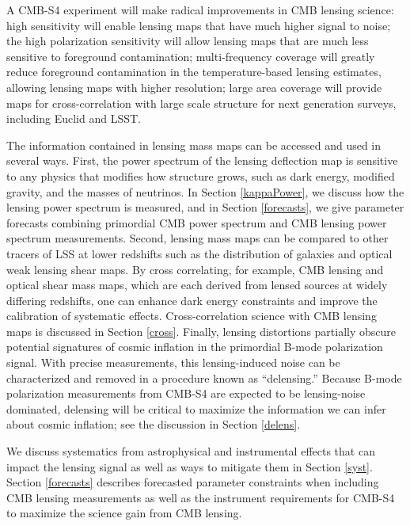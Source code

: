 A CMB-S4 experiment will make radical improvements in CMB lensing science:
high sensitivity will enable lensing maps that have much higher signal to
noise; the high polarization sensitivity will allow
lensing maps that are much less sensitive to foreground contamination;
multi-frequency coverage will greatly reduce foreground 
contamination in the temperature-based lensing estimates, 
allowing lensing maps with higher resolution;
large area coverage will provide maps for cross-correlation with large
scale structure for next generation surveys, including Euclid and LSST.


The information contained in lensing mass maps can be accessed and used in several ways.
First, the power spectrum of the lensing deflection map is sensitive to any physics that modifies how structure grows, such as dark energy, modified gravity, and the masses of neutrinos.
In Section \ref{kappaPower}, we discuss how the lensing power spectrum is measured, and in Section \ref{forecasts}, we give parameter forecasts combining primordial CMB power spectrum and CMB lensing power spectrum measurements.
Second, lensing mass maps can be compared to other tracers of LSS at lower redshifts such as the distribution of galaxies and optical weak lensing shear maps.  By cross correlating, for example, CMB lensing and optical shear mass maps, which are each derived from lensed sources at widely differing redshifts, one can enhance dark energy constraints and improve the calibration of systematic effects.
Cross-correlation science with CMB lensing maps is discussed in Section \ref{cross}.
Finally, lensing distortions partially obscure potential signatures of cosmic inflation in the primordial B-mode polarization signal.
With precise measurements, this lensing-induced noise can be characterized and removed in a procedure known as ``delensing.''
Because B-mode polarization measurements from CMB-S4 are expected to be lensing-noise dominated, delensing will be critical to maximize the information we can infer about cosmic inflation; see the discussion in Section \ref{delens}.

We discuss systematics from astrophysical and instrumental effects that can impact the lensing signal as well as ways to mitigate them in Section \ref{syst}.  Section \ref{forecasts} describes forecasted parameter constraints when including CMB lensing measurements as well as the instrument requirements for CMB-S4 to maximize the science gain from CMB lensing.


